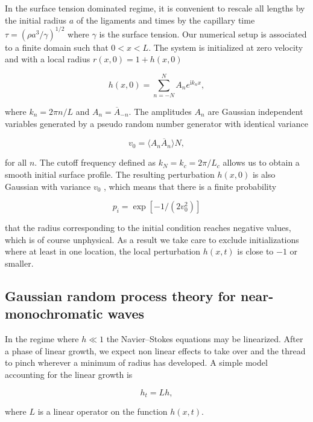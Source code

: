 \newcommand\be{\begin{equation}}
\newcommand\nd{\end{equation}}
\newcommand\ii{{\textrm{i}}}

In the surface tension dominated regime, it is convenient to rescale all lengths by the
initial radius $a$ of the ligaments and times by the capillary time
$\tau = (\rho a^3/\gamma)^{1/2}$ where $\gamma$ is the surface tension.
Our numerical setup is associated to a finite domain such that $0 < x < L$. 
The system is initialized at zero velocity and with a local radius $r(x,0) = 1 + h(x,0)$


\be
h(x,0) = \sum_{n=-N}^{N}  A_n e^{\ii k_n x} ,  \label{p1}
\nd

where $k_n=2\pi n / L$ and $A_n = \overline A_{-n}$. 
The amplitudes $A_n$ are Gaussian independent variables
generated by a pseudo random number generator with identical variance

\be
v_0 = \langle A_n \overline A_n \rangle N ,
\nd

for all $n$. The cutoff frequency defined as $k_N=k_c = 2\pi /L_c$ allows us to obtain a smooth
initial surface profile. The resulting perturbation $h(x,0)$ is also Gaussian with variance $v_0$ 
, which means that there is a finite probability

\be
p_i = \exp[{-1/(2 v_0^2)}] \label{p2}
\nd

that the radius corresponding to the initial condition reaches negative values, 
which is of course unphysical. 
As a result we take care to exclude initializations where at least in one location, 
the local perturbation $h(x,t)$ is close to $-1$ or smaller.

\subsection*{Gaussian random process theory for near-monochromatic waves}

In the regime where $h \ll 1$ the Navier--Stokes equations may be linearized.
After a phase of linear growth, we expect non linear effects to take over 
and the thread to pinch wherever a minimum of radius has developed. 
A simple model accounting for the linear growth is  

\be
h_t = L h , 
\nd

where $L$ is a linear operator on the function $h(x,t)$.
%

